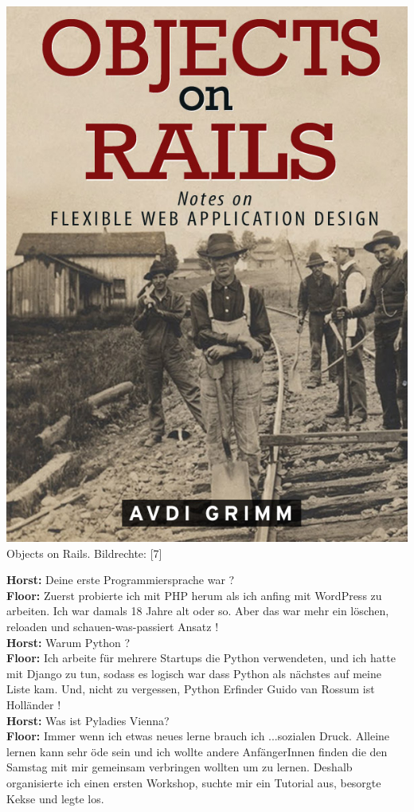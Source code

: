 \documentclass[10pt,a4paper,ngerman,twoside]{article} %
\begin{document}
\begin{multicols}{3}
\begin{center}
\includegraphics[width=\linewidth]{floor/floor-rails.jpg} \\
\footnotesize{Objects on Rails. Bildrechte: [7]} 
\end{center}
\textbf{Horst:} Deine erste Programmiersprache war ? \\
\textbf{Floor:} Zuerst probierte ich mit PHP herum als ich anfing mit WordPress zu arbeiten. Ich war damals 18 Jahre alt oder so. Aber das war mehr ein löschen, reloaden und schauen-was-passiert Ansatz ! \\
\textbf{Horst:} Warum Python ? \\
\textbf{Floor:} Ich arbeite für mehrere Startups die Python verwendeten, und ich hatte mit Django zu tun, sodass es logisch war dass Python als nächstes auf meine Liste kam. Und, nicht zu vergessen, Python Erfinder Guido van Rossum ist Holländer ! \\
\textbf{Horst:} Was ist Pyladies Vienna? \\
\textbf{Floor:} Immer wenn ich etwas neues lerne brauch ich ...sozialen Druck. Alleine lernen kann sehr öde sein und ich wollte andere AnfängerInnen finden die den Samstag mit mir gemeinsam verbringen wollten um zu lernen. Deshalb organisierte ich einen ersten Workshop, suchte mir ein Tutorial aus, besorgte Kekse und legte los.


\end{multicols}
\end{document}
